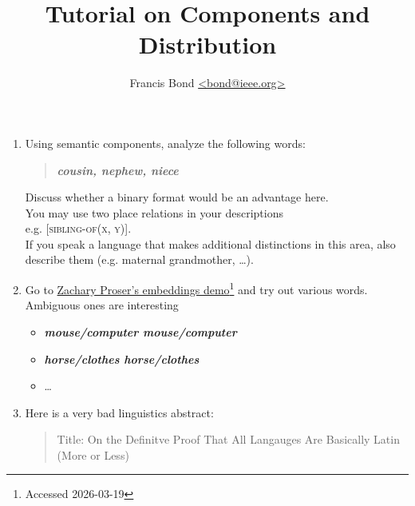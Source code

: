 \documentclass[a4paper]{article}
\title{Tutorial on Components and Distribution}
\author{Francis Bond \url{<bond@ieee.org>}}
\date{}%
\newcommand{\lex}[1]{\textbf{\textit{#1}}}
\newcommand{\cmp}[1]{{[\textsc{#1}]}}
\begin{document}
\maketitle
\begin{enumerate}

    
\item Using semantic components, analyze the following words:
  \begin{quote}
  \lex{cousin, nephew, niece}
  \end{quote}
  Discuss whether a binary format would be an advantage here.
  \\ You may use two place relations in your descriptions \\ e.g. \cmp{sibling-of(x, y)}.
  \\ If you speak a language that makes additional distinctions in this area, also describe them (e.g. maternal grandmother, \ldots).


  

 
\item Go to \href{https://zackproser.com/demos/embeddings}{Zachary Proser's embeddings demo}\footnote{Accessed  2026-03-19} and try out various words.  Ambiguous ones are interesting
  \begin{itemize}
  \item \lex{mouse/computer mouse/computer}
  \item \lex{horse/clothes horse/clothes}
  \item \ldots
  \end{itemize}
  \newpage
\item Here is a very bad linguistics abstract:
\begin{quotation}
Title:  On the Definitve Proof That All Langauges Are Basically Latin (More or Less)


\end{quotation}
\end{enumerate}
\end{document}
